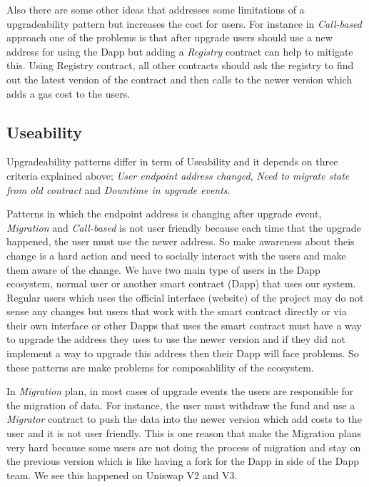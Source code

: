 Also there are some other ideas that addresses some limitations of a upgradeability pattern but increases the cost for users. For instance in \textit{Call-based} approach one of the problems is that after upgrade users should use a new address for using the Dapp but adding a \emph{Registry} contract can help to mitigate this. Using Registry contract, all other contracts should ask the registry to find out the latest version of the contract and then calls to the newer version which adds a gas cost to the users. 

 
 \subsection{Useability}
 Upgradeability patterns differ in term of Useability and it depends on three criteria explained above; \textit{User endpoint address changed}, \textit{Need to migrate state from old contract} and \textit{Downtime in upgrade events}.

Patterns in which the endpoint address is changing after upgrade event, \textit{Migration} and \textit{Call-based} is not user friendly because each time that the upgrade happened, the user must use the newer address. So make awareness about theis change is a hard action and need to socially interact with the users and make them aware of the change. We have two main type of users in the Dapp ecosystem, normal user or another smart contract (Dapp) that uses our system. Regular users which uses the official interface (website) of the project may do not sense any changes but users that work with the smart contract directly or via their own interface or other Dapps that uses the smart contract must have a way to upgrade the address they uses to use the newer version and if they did not implement a way to upgrade this address then their Dapp will face problems. So these patterns are make problems for composablility of the ecosystem.

In \textit{Migration} plan, in most cases of upgrade events the users are responsible for the migration of data. For instance, the user must withdraw the fund and use a \textit{Migrator} contract to push the data into the newer version which add costs to the user and it is not user friendly. This is one reason that make the Migration plans very hard because some users are not doing the process of migration and stay on the previous version which is like having a fork for the Dapp in side of the Dapp team. We see this happened on Uniswap V2 and V3.

